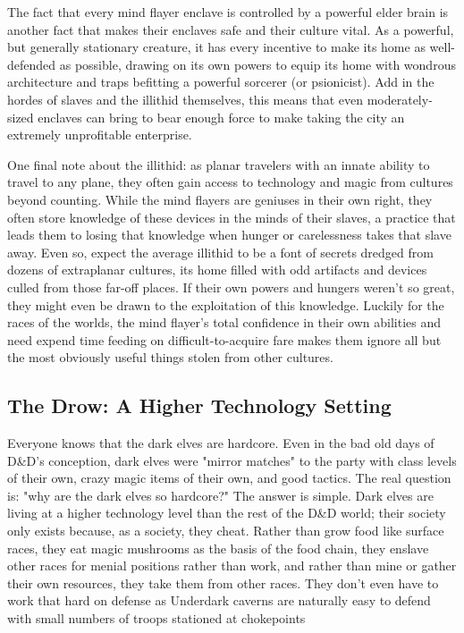 The fact that every mind flayer enclave is controlled by a powerful elder brain is another fact that makes their enclaves safe and their culture vital. As a powerful, but generally stationary creature, it has every incentive to make its home as well-defended as possible, drawing on its own powers to equip its home with wondrous architecture and traps befitting a powerful sorcerer (or psionicist). Add in the hordes of slaves and the illithid themselves, this means that even moderately-sized enclaves can bring to bear enough force to make taking the city an extremely unprofitable enterprise.

One final note about the illithid: as planar travelers with an innate ability to travel to any plane, they often gain access to technology and magic from cultures beyond counting. While the mind flayers are geniuses in their own right, they often store knowledge of these devices in the minds of their slaves, a practice that leads them to losing that knowledge when hunger or carelessness takes that slave away. Even so, expect the average illithid to be a font of secrets dredged from dozens of extraplanar cultures, its home filled with odd artifacts and devices culled from those far-off places. If their own powers and hungers weren't so great, they might even be drawn to the exploitation of this knowledge. Luckily for the races of the worlds, the mind flayer's total confidence in their own abilities and need expend time feeding on difficult-to-acquire fare makes them ignore all but the most obviously useful things stolen from other cultures.\\



\subsection{The Drow: A Higher Technology Setting}
Everyone knows that the dark elves are hardcore. Even in the bad old days of D\&D's conception, dark elves were "mirror matches" to the party with class levels of their own, crazy magic items of their own, and good tactics. The real question is: "why are the dark elves so hardcore?" The answer is simple. Dark elves are living at a higher technology level than the rest of the D\&D world; their society only exists because, as a society, they cheat. Rather than grow food like surface races, they eat magic mushrooms as the basis of the food chain, they enslave other races for menial positions rather than work, and rather than mine or gather their own resources, they take them from other races. They don't even have to work that hard on defense as Underdark caverns are naturally easy to defend with small numbers of troops stationed at chokepoints

